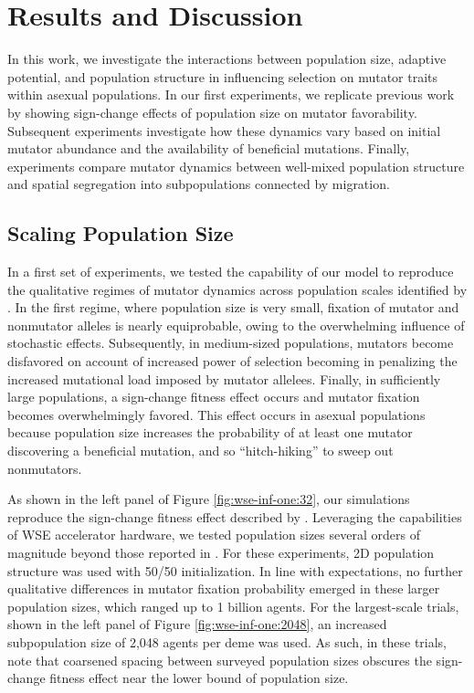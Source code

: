 \section{Results and Discussion} \label{sec:results}

In this work, we investigate the interactions between population size, adaptive potential, and population structure in influencing selection on mutator traits within asexual populations.
In our first experiments, we replicate previous work by \citet{raynes2018sign} showing sign-change effects of population size on mutator favorability.
Subsequent experiments investigate how these dynamics vary based on initial mutator abundance and the availability of beneficial mutations.
Finally, experiments compare mutator dynamics between well-mixed population structure and spatial segregation into subpopulations connected by migration.

\subsection{Scaling Population Size}
\label{sec:scaling-population-size}

In a first set of experiments, we tested the capability of our model to reproduce the qualitative regimes of mutator dynamics across population scales identified by \citet{raynes2018sign}.
In the first regime, where population size is very small, fixation of mutator and nonmutator alleles is nearly equiprobable, owing to the overwhelming influence of stochastic effects.
Subsequently, in medium-sized populations, mutators become disfavored on account of increased power of selection becoming in penalizing the increased mutational load imposed by mutator allelees.
Finally, in sufficiently large populations, a sign-change fitness effect occurs and mutator fixation becomes overwhelmingly favored.
This effect occurs in asexual populations because population size increases the probability of at least one mutator discovering a beneficial mutation, and so ``hitch-hiking'' to sweep out nonmutators.



As shown in the left panel of Figure \ref{fig:wse-inf-one:32}, our simulations reproduce the sign-change fitness effect described by \citet{raynes2018sign}.
Leveraging the capabilities of WSE accelerator hardware, we tested population sizes several orders of magnitude beyond those reported in \citet{raynes2018sign}.
For these experiments, 2D population structure was used with 50/50 initialization.
In line with expectations, no further qualitative differences in mutator fixation probability emerged in these larger population sizes, which ranged up to 1 billion agents.
For the largest-scale trials, shown in the left panel of Figure \ref{fig:wse-inf-one:2048}, an increased subpopulation size of 2,048 agents per deme was used.
As such, in these trials, note that coarsened spacing between surveyed population sizes obscures the sign-change fitness effect near the lower bound of population size.

